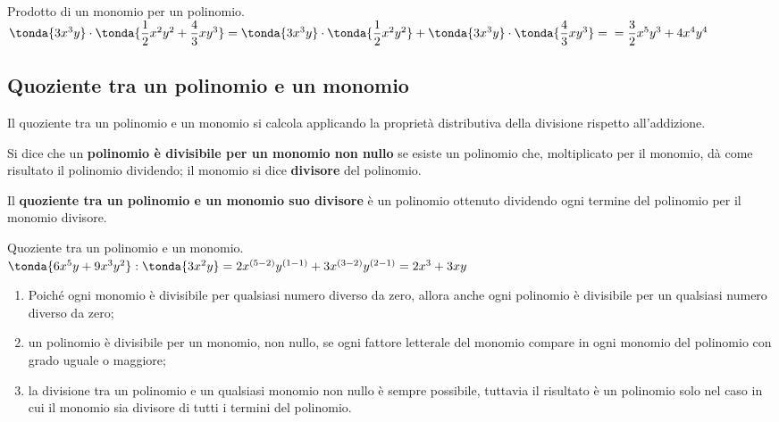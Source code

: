 \begin{esempio}{}{}
 Prodotto di un monomio per un polinomio.\\ [.5em]
\(
\tonda{3x^{3}y}\cdot\tonda{\dfrac{1}{2}x^{2}y^{2}+\dfrac{4}{3}{xy}^{3}}
=\tonda{3x^{3}y}\cdot\tonda{\dfrac{1}{2}x^{2}y^{2}}
+\tonda{3x^{3}y}\cdot\tonda{\dfrac{4}{3}{xy}^{3}} = \newline
=\dfrac{3}{2}x^{5}y^{3}+4x^{4}y^{4}
\)
\end{esempio}


\subsection{Quoziente tra un polinomio e un monomio}
\label{subsec:poli_quozientepermonomio}

Il quoziente tra un 
polinomio e un monomio si calcola applicando la
proprietà distributiva della divisione rispetto
all'addizione.

\begin{definizione}{}{}
Si dice che un \textbf{polinomio è divisibile per un monomio non
nullo} se esiste un polinomio che, moltiplicato per il monomio, dà
come risultato il polinomio dividendo; il monomio si dice
\textbf{divisore} del polinomio.
\end{definizione}

\begin{definizione}{}{}
Il \textbf{quoziente tra un polinomio e un monomio suo divisore} è un
polinomio ottenuto dividendo ogni termine del polinomio per il monomio
divisore.
\end{definizione}

\begin{esempio}{}{}
Quoziente tra un polinomio e un monomio.\\ [.5em]
\(\tonda{6x^{5}y+9x^{3}y^{2}}:\tonda{3x^{2}y} = 
2x^{(5-2)}y^{(1-1)}+3x^{(3-2)}y^{(2-1)} = 2x^{3}+3{xy}\)
\end{esempio}

\begin{osservazione}{}{}
\begin{enumerate}[nosep, label=\alph*)]
\item Poiché ogni monomio è divisibile per qualsiasi numero diverso
da zero, allora anche ogni polinomio è divisibile per un qualsiasi
numero diverso da zero;
\item un polinomio è divisibile per un monomio, non nullo, se ogni
fattore letterale del monomio compare in ogni monomio del polinomio
con grado uguale o maggiore;
\item la divisione tra un polinomio e un qualsiasi monomio non nullo è
sempre possibile, tuttavia il risultato è un polinomio solo nel caso
in cui il monomio sia divisore di tutti i termini del polinomio.
\end{enumerate}
\end{osservazione}

